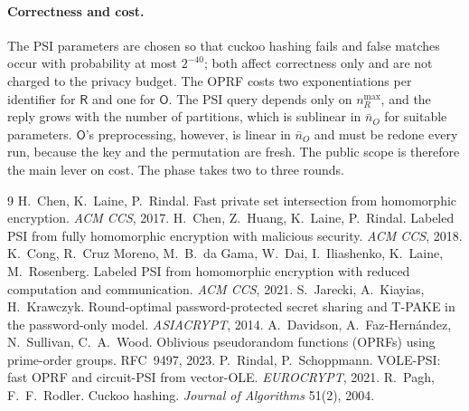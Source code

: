 \documentclass[10pt]{article}
\newcommand{\Rp}{\mathsf{R}}
\newcommand{\Op}{\mathsf{O}}
\newcommand{\nR}{n_R^{\max}}
\newcommand{\nO}{\bar n_O}
\begin{document}
\paragraph{Correctness and cost.} The PSI parameters are chosen so that cuckoo hashing fails and false matches occur with probability at most $2^{-40}$; both affect correctness only and are not charged to the privacy budget. The OPRF costs two exponentiations per identifier for $\Rp$ and one for $\Op$. The PSI query depends only on $\nR$, and the reply grows with the number of partitions, which is sublinear in $\nO$ for suitable parameters. $\Op$'s preprocessing, however, is linear in $\nO$ and must be redone every run, because the key and the permutation are fresh. The public scope is therefore the main lever on cost. The phase takes two to three rounds.

\begin{thebibliography}{9}\small
\setlength{\itemsep}{0pt}
 H.~Chen, K.~Laine, P.~Rindal. Fast private set intersection from homomorphic encryption. \emph{ACM CCS}, 2017.
 H.~Chen, Z.~Huang, K.~Laine, P.~Rindal. Labeled PSI from fully homomorphic encryption with malicious security. \emph{ACM CCS}, 2018.
 K.~Cong, R.~Cruz Moreno, M.~B.~da Gama, W.~Dai, I.~Iliashenko, K.~Laine, M.~Rosenberg. Labeled PSI from homomorphic encryption with reduced computation and communication. \emph{ACM CCS}, 2021.
 S.~Jarecki, A.~Kiayias, H.~Krawczyk. Round-optimal password-protected secret sharing and T-PAKE in the password-only model. \emph{ASIACRYPT}, 2014.
 A.~Davidson, A.~Faz-Hern\'andez, N.~Sullivan, C.~A.~Wood. Oblivious pseudorandom functions (OPRFs) using prime-order groups. RFC~9497, 2023.
 P.~Rindal, P.~Schoppmann. VOLE-PSI: fast OPRF and circuit-PSI from vector-OLE. \emph{EUROCRYPT}, 2021.
 R.~Pagh, F.~F.~Rodler. Cuckoo hashing. \emph{Journal of Algorithms} 51(2), 2004.
\end{thebibliography}
\end{document}
